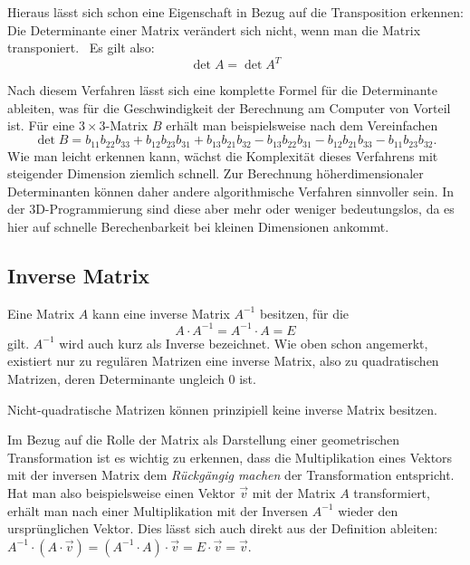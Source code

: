 Hieraus lässt sich schon eine Eigenschaft in Bezug auf die Transposition erkennen: Die Determinante einer Matrix verändert sich nicht, wenn man die Matrix transponiert. \ Es gilt also:
\begin{equation}
\label{transposeddeterminant}
 \det A = \det A^T
\end{equation}

Nach diesem Verfahren lässt sich eine komplette Formel für die Determinante ableiten, was für die Geschwindigkeit der Berechnung am Computer von Vorteil ist. Für eine $3 \times 3$-Matrix $B$ erhält man beispielsweise nach dem Vereinfachen
\begin{equation}
 \det B = b_{11} b_{22} b_{33} + b_{12} b_{23} b_{31} + b_{13} b_{21} b_{32} - b_{13} b_{22} b_{31} - b_{12} b_{21} b_{33} - b_{11} b_{23} b_{32}.
\end{equation}
Wie man leicht erkennen kann, wächst die Komplexität dieses Verfahrens mit steigender Dimension ziemlich schnell. Zur Berechnung höherdimensionaler Determinanten können daher andere algorithmische Verfahren sinnvoller sein. In der 3D-Programmierung sind diese aber mehr oder weniger bedeutungslos, da es hier auf schnelle Berechenbarkeit bei kleinen Dimensionen ankommt.

\subsection{Inverse Matrix}
\label{inversion}
Eine Matrix $A$ kann eine inverse Matrix $A^{-1}$ besitzen, für die
\begin{equation}
 A \cdot A^{-1} = A^{-1} \cdot A = E
\end{equation}
gilt. $A^{-1}$ wird auch kurz als Inverse bezeichnet. Wie oben schon angemerkt, existiert nur zu regulären Matrizen eine inverse Matrix, also zu quadratischen Matrizen, deren Determinante ungleich $0$ ist. 

Nicht-quadratische Matrizen können prinzipiell keine inverse Matrix besitzen.

Im Bezug auf die Rolle der Matrix als Darstellung einer geometrischen Transformation ist es wichtig zu erkennen, dass die Multiplikation eines Vektors mit der inversen Matrix dem \emph{Rückgängig machen} der Transformation entspricht. Hat man also beispielsweise einen Vektor $\vec v$ mit der Matrix $A$ transformiert, erhält man nach einer Multiplikation mit der Inversen $A^{-1}$ wieder den ursprünglichen Vektor. Dies lässt sich auch direkt aus der Definition ableiten: $A^{-1} \cdot ( A \cdot \vec v ) = (A^{-1} \cdot A) \cdot \vec v = E \cdot \vec v = \vec v$.

